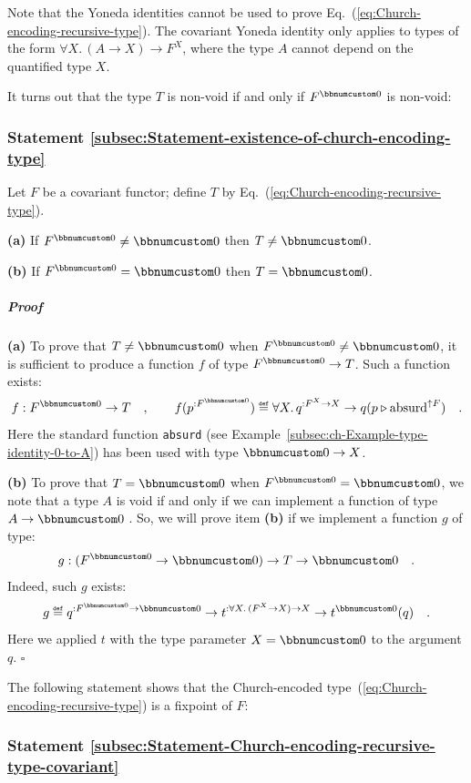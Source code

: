 Note that the Yoneda identities cannot be used to prove Eq.~(\ref{eq:Church-encoding-recursive-type}).
The covariant Yoneda identity only applies to types of the form $\forall X.\,(A\rightarrow X)\rightarrow F^{X}$,
where the type $A$ cannot depend on the quantified type $X$.

It turns out that the type $T$ is non-void if and only if $F^{\bbnum 0}$
is non-void:

\subsubsection{Statement \label{subsec:Statement-existence-of-church-encoding-type}\ref{subsec:Statement-existence-of-church-encoding-type}}

Let $F$ be a covariant functor; define $T$ by Eq.~(\ref{eq:Church-encoding-recursive-type}).

\textbf{(a)} If $F^{\bbnum 0}\neq\bbnum 0$ then $T\neq\bbnum 0$. 

\textbf{(b)} If $F^{\bbnum 0}=\bbnum 0$ then $T=\bbnum 0$. 

\subparagraph{Proof}

\textbf{(a)} To prove that $T\neq\bbnum 0$ when $F^{\bbnum 0}\neq\bbnum 0$,
it is sufficient to produce a function $f$ of type $F^{\bbnum 0}\rightarrow T$.
Such a function exists:
\[
f:F^{\bbnum 0}\rightarrow T\quad,\quad\quad f(p^{:F^{\bbnum 0}})\triangleq\forall X.\,q^{:F^{X}\rightarrow X}\rightarrow q(p\triangleright\text{absurd}^{\uparrow F})\quad.
\]
Here the standard function \lstinline!absurd! (see Example~\ref{subsec:ch-Example-type-identity-0-to-A})
has been used with type $\bbnum 0\rightarrow X$.

\textbf{(b)} To prove that $T=\bbnum 0$ when $F^{\bbnum 0}=\bbnum 0$,
we note that a type $A$ is void if and only if we can implement a
function of type $A\rightarrow\bbnum 0$ . So, we will prove item
\textbf{(b)} if we implement a function $g$ of type:
\[
g:(F^{\bbnum 0}\rightarrow\bbnum 0)\rightarrow T\rightarrow\bbnum 0\quad.
\]
Indeed, such $g$ exists:
\[
g\triangleq q^{:F^{\bbnum 0}\rightarrow\bbnum 0}\rightarrow t^{:\forall X.\,(F^{X}\rightarrow X)\rightarrow X}\rightarrow t^{\bbnum 0}(q)\quad.
\]
Here we applied $t$ with the type parameter $X=\bbnum 0$ to the
argument $q$. $\square$

The following statement shows that the Church-encoded type~(\ref{eq:Church-encoding-recursive-type})
is a fixpoint of $F$:

\subsubsection{Statement \label{subsec:Statement-Church-encoding-recursive-type-covariant}\ref{subsec:Statement-Church-encoding-recursive-type-covariant}}

